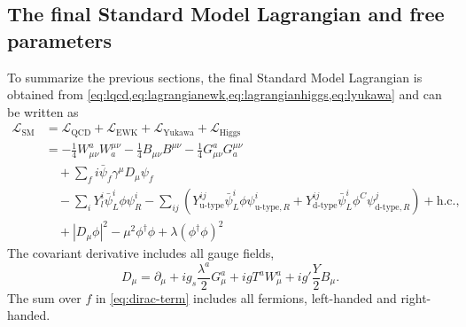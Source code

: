 \subsection{The final Standard Model Lagrangian and free parameters}
\label{subsec:final-lagrangian}
To summarize the previous sections, the final Standard Model Lagrangian is obtained from \cref{eq:lqcd,eq:lagrangianewk,eq:lagrangianhiggs,eq:lyukawa} and can be written as
\begin{align}
  \mathcal{L}_\text{SM} & = \mathcal{L}_\text{QCD} + \mathcal{L}_\text{EWK} + \mathcal{L}_\text{Yukawa} + \mathcal{L}_\text{Higgs}                                                                                                                                                       \\
                        & = - \frac{1}{4}W_{\mu\nu}^aW^{\mu\nu}_{a} - \frac{1}{4} B_{\mu\nu}B^{\mu\nu} - \frac{1}{4}G_{\mu\nu}^aG^{\mu\nu}_{a}                                                                                                                                           \\
  \label{eq:dirac-term}
                        & \quad + \sum_f i \bar{\psi}_f\gamma^\mu D_\mu\psi_f                                                                                                                                                                                                            \\
                        & \quad - \sum_{i} Y_l^i \bar{\psi}^{i}_{L} \phi \psi^{i}_{R} - \sum_{ij} \left( Y_{\text{u-type}}^{ij} \bar{\psi}^{i}_{L} \phi \psi^{i}_{\text{u-type},R} + Y_{\text{d-type}}^{ij} \bar{\psi}^{i}_{L} \phi^C \psi^{j}_{\text{d-type}, R} \right) + \text{h.c.}, \\
                        & \quad + |D_\mu\phi|^2 - \mu^2\phi^\dagger\phi + \lambda \left(\phi^\dagger\phi \right)^2
\end{align}
The covariant derivative includes all gauge fields,
\begin{equation}
  D_\mu = \partial_\mu + i g_s \frac{\lambda^a}{2} G_\mu^a + igT^aW_\mu^a + ig'\frac{Y}{2}B_\mu.
\end{equation}
The sum over $f$ in \cref{eq:dirac-term} includes all fermions, left-handed and right-handed.

